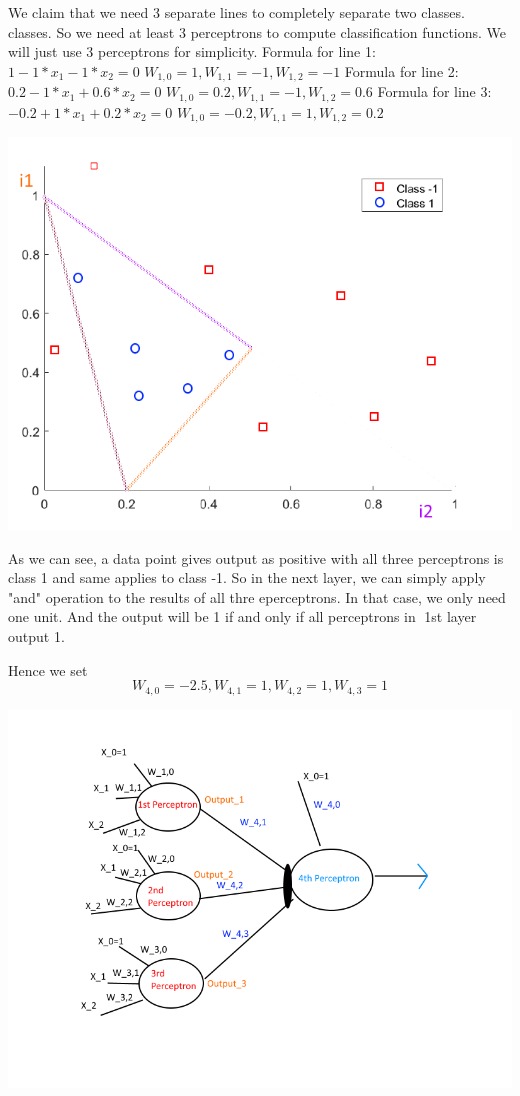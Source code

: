 \documentclass[12pt, letterpaper]{article}
\begin{document}
	We claim that we need 3 separate lines to completely separate two classes. classes. So we need at least 3 perceptrons
	to compute classification functions. We will just use 3 perceptrons for simplicity.\newline
	\newline
	Formula for line 1:\newline
	$1-1*x_{1}-1*x_{2}=0$\newline
	$W_{1,0}=1,W_{1,1}=-1,W_{1,2}=-1$\newline
	Formula for line 2:\newline
	$0.2-1*x_{1}+0.6*x_{2}=0$\newline
	$W_{1,0}=0.2,W_{1,1}=-1,W_{1,2}=0.6$\newline
	Formula for line 3:\newline
	$-0.2+1*x_{1}+0.2*x_{2}=0$\newline
	$W_{1,0}=-0.2,W_{1,1}=1,W_{1,2}=0.2$\newline
	
	\includegraphics[scale=0.6]{"problem-5b-1"}
	
	As we can see, a data point gives output as positive with all three perceptrons is class 1 and same applies to class -1.
	So in the next layer, we can simply apply "and" operation to the results of all thre eperceptrons. In that case, we only need one unit. And the output will be 1 if and only if all perceptrons in 1st layer output 1.
	
	Hence we set $$W_{4,0}=-2.5,W_{4,1}=1,W_{4,2}=1,W_{4,3}=1$$\newline
	
	\includegraphics[scale=0.6]{"problem-5b-2"}
	
	
	
	
\end{document}
